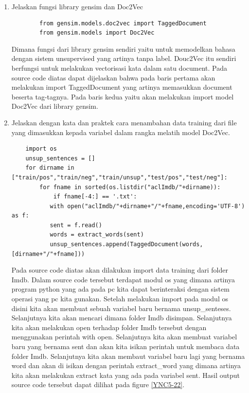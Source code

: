 \begin{enumerate}
\item Jelaskan fungsi library gensim dan Doc2Vec

	\begin{verbatim}
		from gensim.models.doc2vec import TaggedDocument
		from gensim.models import Doc2Vec
	\end{verbatim}	

	\subitem Dimana fungsi dari library gensim sendiri yaitu untuk memodelkan bahasa dengan sistem unsupervised yang artinya tanpa label. Douc2Vec itu sendiri berfungsi untuk melakukan vectorisasi kata dalam satu document. Pada source code diatas dapat dijelaskan bahwa pada baris pertama akan melakukan import TaggedDocument yang artinya memasukkan document beserta tag-tagnya. Pada baris kedua yaitu akan melakukan import model Doc2Vec dari library gensim.

\item Jelaskan dengan kata dan praktek cara menambahan data training dari file yang dimasukkan kepada variabel dalam rangka melatih model Doc2Vec.


	\begin{verbatim}
	import os
	unsup_sentences = []
	for dirname in ["train/pos","train/neg","train/unsup","test/pos","test/neg"]:
    	for fname in sorted(os.listdir("aclImdb/"+dirname)):
        	if fname[-4:] == '.txt':
           with open("aclImdb/"+dirname+"/"+fname,encoding='UTF-8') as f:
           sent = f.read()
           words = extract_words(sent)
           unsup_sentences.append(TaggedDocument(words,[dirname+"/"+fname]))
	\end{verbatim}

	\subitem Pada source code diatas akan dilakukan import data training dari folder Imdb. Dalam source code tersebut terdapat modul os yang dimana artinya program python yang ada pada pc kita dapat berinteraksi dengan sistem operasi yang pc kita gunakan. Setelah melakukan import pada modul os disini kita akan membuat sebuah variabel baru bernama unsup\_senteses. Selanjutnya kita akan mencari dimana folder Imdb disimpan. Selanjutnya kita akan melakukan open terhadap folder Imdb tersebut dengan menggunakan perintah with open. Selanjutnya kita akan membuat variabel baru yang bernama sent dan akan kita isikan perintah untuk membaca data folder Imdb. Selanjutnya kita akan membaut variabel baru lagi yang bernama word dan akan di isikan dengan perintah extract\_word yang dimana artinya kita akan melakukan extract kata yang ada pada variabel sent. Hasil output source code tersebut dapat dilihat pada figure \ref{YNC5-22}.


\end{enumerate}
